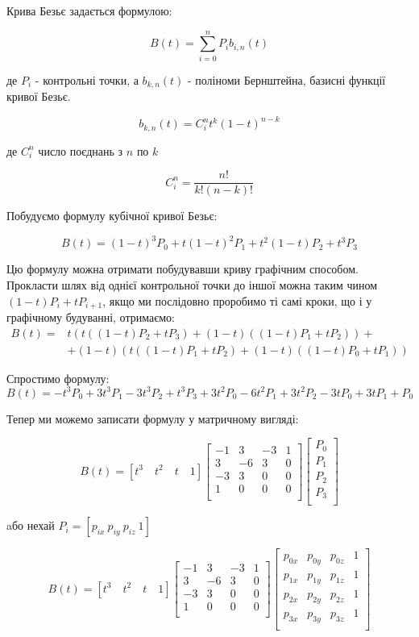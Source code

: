 \let\mypdfximage\pdfximage\def\pdfximage{\immediate\mypdfximage}\documentclass[14pt,a4paper]{extarticle}
\theoremstyle{definition}
\renewcommand{\[}{\begin{singlespace}\begin{equation*}}
\renewcommand{\]}{\end{equation*}\end{singlespace}}
\renewcommand{\+}{\discretionary{\mbox{\scriptsize$\hookleftarrow$}}{}{}}
\begin{document}
Крива Безьє задається формулою:
\[B(t)=\sum_{i=0}^n P_i b_{i,n}(t)\]
де $P_i$ - контрольні точки, а $b_{k,n}(t)$ - поліноми Бернштейна, базисні функції кривої Безьє.
\[b_{k,n}(t)=C_i^nt^k(1-t)^{n-k}\]
де $C_i^n$ число поєднань з $n$ по $k$
\[C_i^n=\frac{n!}{k!(n-k)!}\]

Побудуємо формулу кубічної кривої Безьє:
\[B(t)=(1-t)^3P_0+t(1-t)^2P_1+t^2(1-t)P_2+t^3P_3\]

Цю формулу можна отримати побудувавши криву графічним способом. Прокласти шлях від однієї контрольної точки до іншої можна таким чином $(1-t)P_i+tP_{i+1}$, якщо ми послідовно проробимо ті самі кроки, що і у графічному будуванні, отримаємо:
\begin{align*}
B(t)=&t (t ((1 - t) P_{2} + t P_{3}) + (1 - t) ((1 - t) P_{1} + t P_{2})) +\\
&+(1 - t) (t ((1 - t) P_{1} + t P_{2}) + (1 - t) ((1 - t) P_{0} + t P_{1}))
\end{align*}

Спростимо формулу:
\begin{equation}
\label{eq:bezier_curve}
B(t) = -t^3P_0+3t^3P_1-3t^3P_2+t^3P_3 + 3t^2P_0-6t^2P_1+3t^2P_2 - 3tP_0+3tP_1 + P_0
\end{equation}

Тепер ми можемо записати формулу у матричному вигляді:
\[B(t)=[t^3\quad t^2\quad t\quad 1]\left[\begin{matrix}
-1 &  3 & -3 & 1 \\
 3 & -6 &  3 & 0 \\
-3 &  3 &  0 & 0 \\
 1 &  0 &  0 & 0 \\
\end{matrix}\right]\left[\begin{matrix}
P_0 \\ P_1 \\ P_2 \\ P_3 \\
\end{matrix}\right]\]
aбо нехай $P_i = [p_{ix}\ p_{iy}\ p_{iz}\ 1]$
\[B(t)=[t^3\quad t^2\quad t\quad 1]\left[\begin{matrix}
-1 &  3 & -3 & 1 \\
 3 & -6 &  3 & 0 \\
-3 &  3 &  0 & 0 \\
 1 &  0 &  0 & 0 \\
\end{matrix}\right]\left[\begin{matrix}
p_{0x} & p_{0y} & p_{0z} & 1 \\
p_{1x} & p_{1y} & p_{1z} & 1 \\
p_{2x} & p_{2y} & p_{2z} & 1 \\
p_{3x} & p_{3y} & p_{3z} & 1 \\
\end{matrix}\right]\]
\end{document}

